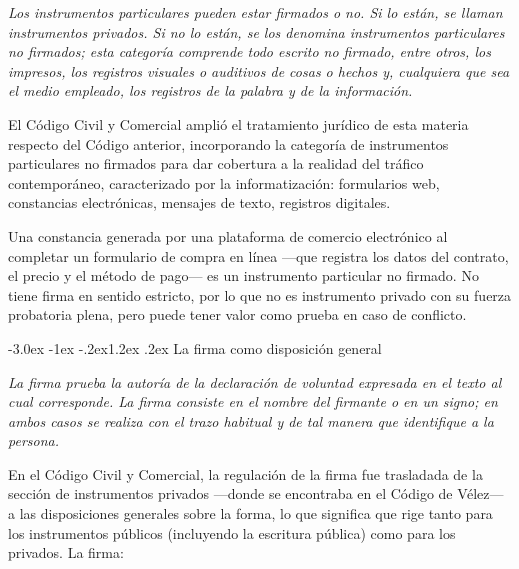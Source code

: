 \documentclass[12pt,oneside]{book}
\makeatletter
\renewcommand\section{\@startsection{section}{1}{\z@}%
  {-3.0ex \@plus -1ex \@minus -.2ex}{1.2ex \@plus .2ex}%
  {\normalfont\large\bfseries\color{acento}}}
\makeatother
\begin{document}
\begin{regla}
\textit{Los instrumentos particulares pueden estar firmados o no. Si lo están, se llaman instrumentos privados. Si no lo están, se los denomina instrumentos particulares no firmados; esta categoría comprende todo escrito no firmado, entre otros, los impresos, los registros visuales o auditivos de cosas o hechos y, cualquiera que sea el medio empleado, los registros de la palabra y de la información.}
\end{regla}

El Código Civil y Comercial amplió el tratamiento jurídico de esta materia respecto del Código anterior, incorporando la categoría de instrumentos particulares no firmados para dar cobertura a la realidad del tráfico contemporáneo, caracterizado por la informatización: formularios web, constancias electrónicas, mensajes de texto, registros digitales.

\begin{ejemplo}
Una constancia generada por una plataforma de comercio electrónico al completar un formulario de compra en línea ---que registra los datos del contrato, el precio y el método de pago--- es un instrumento particular no firmado. No tiene firma en sentido estricto, por lo que no es instrumento privado con su fuerza probatoria plena, pero puede tener valor como prueba en caso de conflicto.
\end{ejemplo}

\section{La firma como disposición general}

\begin{regla}
\textit{La firma prueba la autoría de la declaración de voluntad expresada en el texto al cual corresponde. La firma consiste en el nombre del firmante o en un signo; en ambos casos se realiza con el trazo habitual y de tal manera que identifique a la persona.}
\end{regla}

En el Código Civil y Comercial, la regulación de la firma fue trasladada de la sección de instrumentos privados ---donde se encontraba en el Código de Vélez--- a las disposiciones generales sobre la forma, lo que significa que rige tanto para los instrumentos públicos (incluyendo la escritura pública) como para los privados. La firma:
\end{document}
